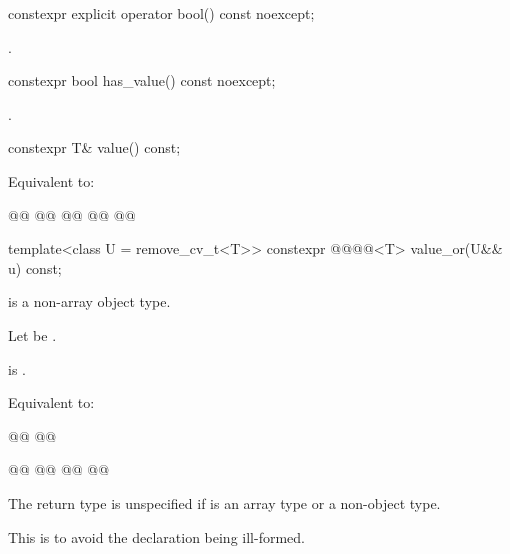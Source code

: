 %
\begin{itemdecl}
constexpr explicit operator bool() const noexcept;
\end{itemdecl}

\begin{itemdescr}
\pnum
\returns
{}.
\end{itemdescr}

%
\begin{itemdecl}
constexpr bool has_value() const noexcept;
\end{itemdecl}

\begin{itemdescr}
\pnum
\returns
{}.
\end{itemdescr}

%
\begin{itemdecl}
constexpr T& value() const;
\end{itemdecl}

\begin{itemdescr}
\pnum
\effects
Equivalent to:
\begin{codeblock}
@@
@@
  @@
@\added{\}}@
@@
\end{codeblock}
\end{itemdescr}

%
\begin{itemdecl}
template<class U = remove_cv_t<T>>
  constexpr @@@@<T> value_or(U&& u) const;
\end{itemdecl}

\begin{itemdescr}
\pnum
\constraints
{} is a non-array object type.

\begin{removedblock}
\pnum
Let  be .
\end{removedblock}

\pnum
\mandates
{} is  .

\pnum
\effects
Equivalent to:
\begin{codeblock}
@@
@@

@@
  @@
@\added{\}}@
@@
\end{codeblock}

\pnum
\remarks
The return type is unspecified if  is an array type or a non-object type.
\begin{note}
This is to avoid the declaration being ill-formed.
\end{note}
\end{itemdescr}


